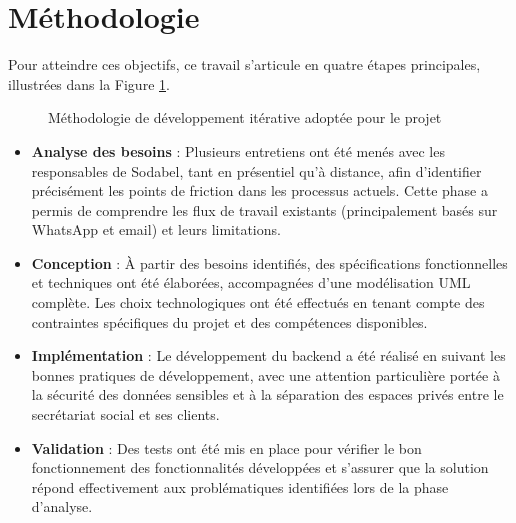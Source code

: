 \section{Méthodologie}

Pour atteindre ces objectifs, ce travail s'articule en quatre étapes principales, illustrées dans la Figure \ref{fig:methodologie}.

\begin{figure}[h]
\centering
{}
\caption{Méthodologie de développement itérative adoptée pour le projet}
\label{fig:methodologie}
\end{figure}

\begin{itemize}
  \item \textbf{Analyse des besoins} : Plusieurs entretiens ont été menés avec les responsables de Sodabel, tant en présentiel qu'à distance, afin d'identifier précisément les points de friction dans les processus actuels. Cette phase a permis de comprendre les flux de travail existants (principalement basés sur WhatsApp et email) et leurs limitations.

  \item \textbf{Conception} : À partir des besoins identifiés, des spécifications fonctionnelles et techniques ont été élaborées, accompagnées d'une modélisation UML complète. Les choix technologiques ont été effectués en tenant compte des contraintes spécifiques du projet et des compétences disponibles.

  \item \textbf{Implémentation} : Le développement du backend a été réalisé en suivant les bonnes pratiques de développement, avec une attention particulière portée à la sécurité des données sensibles et à la séparation des espaces privés entre le secrétariat social et ses clients.

  \item \textbf{Validation} : Des tests ont été mis en place pour vérifier le bon fonctionnement des fonctionnalités développées et s'assurer que la solution répond effectivement aux problématiques identifiées lors de la phase d'analyse.
\end{itemize}

